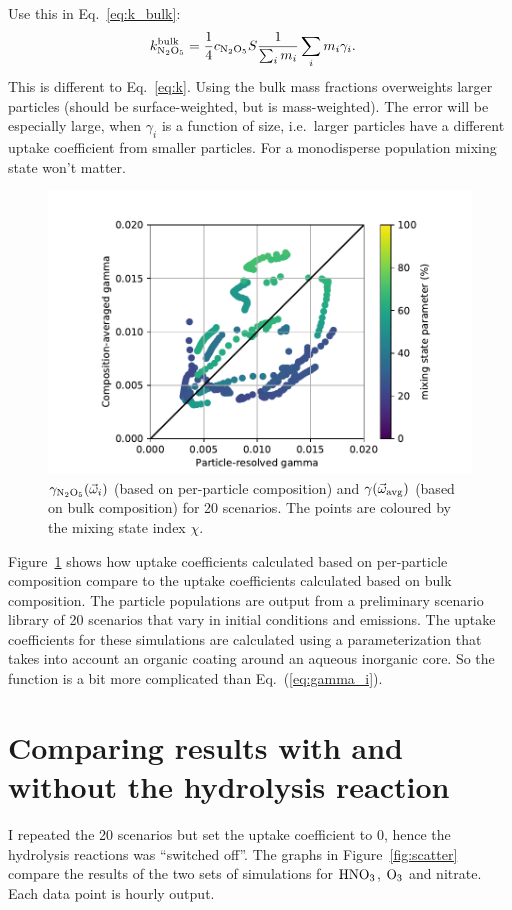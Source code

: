 \documentclass[11pt]{article}
\begin{document}
Use this in Eq.~\ref{eq:k_bulk}:
\begin{align}
  k^{\rm bulk}_{\rm N_2O_5} & = \frac{1}{4} c_{\rm  N_2O_5} S \frac{1}{\sum_i m_i} \sum_i m_i \gamma_i.
\end{align}
This is different to Eq.~\ref{eq:k}. Using the bulk mass fractions
overweights larger particles (should be surface-weighted, but is
mass-weighted). The error will be especially large, when $\gamma_i$ is
a function of size, i.e.\ larger particles have a different uptake
coefficient from smaller particles. For a monodisperse population
mixing state won't matter.


\begin{figure}
  \includegraphics{gamma_values_20_scenarios}
\caption{$\gamma_{\rm N_2O_5}(\vec{\omega}_i)$ (based on per-particle composition) and
  $\gamma(\vec{\omega}_{\rm avg})$ (based on bulk composition) for 20
  scenarios. The points are coloured by the mixing state index
  $\chi$. \label{fig:gamma_values_20_scenarios}}
\end{figure}
Figure~\ref{fig:gamma_values_20_scenarios} shows how uptake
coefficients calculated based on per-particle composition compare to
the uptake coefficients calculated based on bulk composition. The
particle populations are output from a preliminary scenario library of
20 scenarios that vary in initial conditions and emissions. The uptake
coefficients for these simulations are calculated using a
parameterization that takes into account an organic coating around an
aqueous inorganic core. So the function is a bit more complicated than
Eq.~(\ref{eq:gamma_i}).

\section{Comparing results with and without the hydrolysis reaction}
I repeated the 20 scenarios but set the uptake coefficient to 0, hence
the hydrolysis reactions was ``switched off''. The graphs in
Figure~\ref{fig:scatter} compare the results of the two sets of
simulations for $\rm HNO_3$, $\rm O_3$ and nitrate. Each data point is
hourly output.
\end{document}
